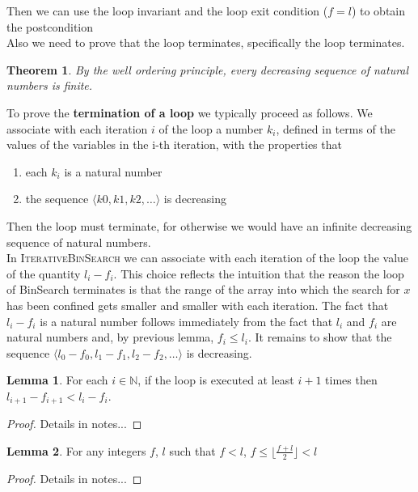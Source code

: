 \documentclass[11pt]{article}
\theoremstyle{plain}%
\newtheorem{theorem}{Theorem}[section]
\theoremstyle{definition}
\newtheorem{lemma}{Lemma}[defn]
\theoremstyle{remark}
\newcommand{\N}{\mathbb{N}}
\begin{document}
Then we can use the loop invariant and the loop exit condition ($f = l$) to obtain the postcondition\\
Also we need to prove that the loop terminates, specifically the loop terminates.
\begin{theorem}
  By the well ordering principle, every decreasing sequence of natural numbers is finite.
\end{theorem}
$ $\\
To prove the \textbf{termination of a loop} we typically proceed as follows. We associate with each iteration $i$ of the loop a number $k_i$, defined in terms of the values of the variables in the i-th iteration, with the properties that
\begin{enumerate}
  \item each $k_i$ is a natural number
  \item the sequence $⟨ k0,k1,k2,\dots ⟩$ is decreasing
\end{enumerate}
Then the loop must terminate, for otherwise we would have an infinite decreasing sequence of natural numbers.
$ $\\
In \textsc{IterativeBinSearch} we can associate with each iteration of the loop the value of the quantity $l_i - f_i$. This choice reflects the intuition that the reason the loop of BinSearch terminates is that the range of the array into which the search for $x$ has been confined gets smaller and smaller with each iteration. The fact that $l_i - f_i$ is a natural number follows immediately from the fact that $l_i$ and $f_i$ are natural numbers and, by previous lemma, $f_i \leq l_i$. It remains to show that the sequence $⟨ l_0 - f_0, l_1 - f_1, l_2 - f_2, \dots ⟩$ is decreasing.

\begin{lemma}
  For each $i \in \N$, if the loop is executed at least $i + 1$ times then $l_{i+1}-f_{i+1} < l_i-f_i$.
  \begin{proof}
    Details in notes...
  \end{proof}
\end{lemma}


\begin{lemma}
  For any integers $f$, $l$ such that $f<l$, $f\leq \lfloor \frac{f+l}{2}\rfloor <l$
  \begin{proof}
    Details in notes...
  \end{proof}
\end{lemma}
\end{document}
